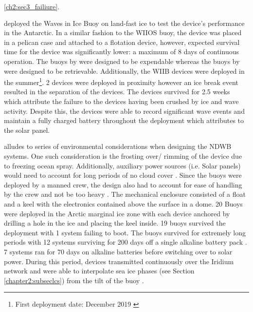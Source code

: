 \ref{ch2:sec3_failiure}. \par 

\textcite{rabault2019open} deployed the Waves in Ice Buoy on land-fast ice to test the device's performance in the Antarctic. In a similar fashion to the WIIOS buoy, the device was placed in a pelican case and attached to a flotation device, however, expected survival time for the device was significantly lower: a maximum of 8 days \cite{rabault2019open} of continuous operation. The buoys by \textcite{kohout2015device} were designed to be expendable\cite{alberello2019drift} whereas the buoys by \textcite{rabault2019open} were designed to be retrievable. Additionally, the WIIB devices were deployed in the summer\footnote{First deployment date: December 2019 \cite{rabault2019open}}. 2 devices were deployed in proximity however an ice break event resulted in the separation of the devices. The devices survived for 2.5 weeks \cite{rabault2019open} which \textcite{rabault2019open} attribute the failure to the devices having been crushed by ice and wave activity. Despite this, the devices were able to record significant wave events and maintain a fully charged battery throughout the deployment which \textcite{rabault2019open} attributes to the solar panel. 

\par \textcite{doble2017robust} alludes to series of environmental considerations when designing the NDWB systems. One such consideration is the frosting over/ rimming of the device due to freezing ocean spray. Additionally, auxiliary power sources (i.e. Solar panels) would need to account for long periods of no cloud cover \cite{doble2017robust}. Since the buoys were deployed by a manned crew, the design also had to account for ease of handling by the crew and not be too heavy \cite{doble2017robust}. The mechanical enclosure consisted of a float and a keel with the electronics contained above the surface in a dome. 20 Buoys were deployed in the Arctic marginal ice zone with each device anchored by drilling a hole in the ice and placing the keel inside. 19 buoys survived the deployment with 1 system failing to boot. The buoys survived for extremely long periods with 12 systems surviving for 200 days off a single alkaline battery pack \cite{doble2017robust}. 7 systems ran for 70 days on alkaline batteries before switching over to solar power. During this period, devices transmitted continuously over the Iridium network and were able to interpolate sea ice phases (see Section \ref{chapter2:subseclcs}) from the tilt of the buoy \cite{doble2017robust}.

